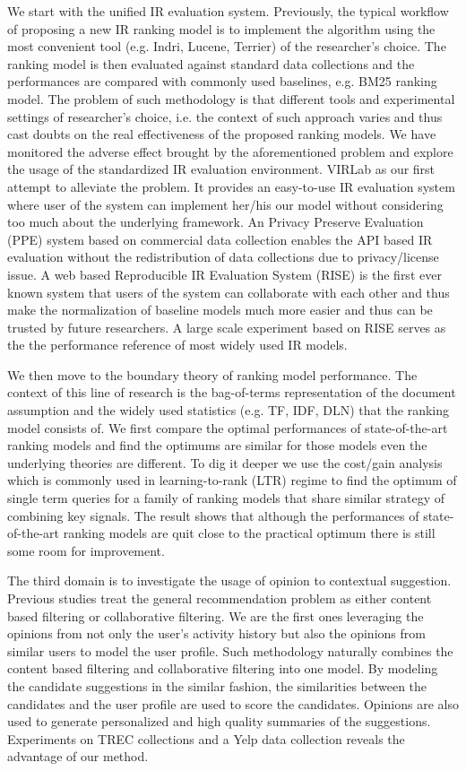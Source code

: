 We start with the unified IR evaluation system. Previously, the typical 
workflow of proposing a new IR ranking model is to implement the algorithm 
using the most convenient tool (e.g. Indri, Lucene, Terrier) of the 
researcher's choice. The ranking model is then evaluated against standard 
data collections and the performances are compared with commonly used 
baselines, e.g. BM25 ranking model. The problem of such methodology is that 
different tools and experimental settings of researcher's choice, i.e. the 
context of such approach varies and thus cast doubts on the real effectiveness 
of the proposed ranking models. 
We have monitored the adverse effect brought by the aforementioned problem and 
explore the usage of the standardized IR evaluation environment. 
VIRLab as our first attempt to alleviate the problem. It provides an 
easy-to-use IR evaluation system where user of the system can implement 
her/his our model without considering too much about the underlying framework. 
An Privacy Preserve Evaluation (PPE) system based on commercial data 
collection enables the API based IR evaluation without the redistribution 
of data collections due to privacy/license issue.
A web based Reproducible IR Evaluation System (RISE) is the first ever known 
system that users of the system can collaborate with each other and thus make 
the normalization of baseline models much more easier and thus can be trusted 
by future researchers. A large scale experiment based on RISE serves as the 
the performance reference of most widely used IR models.

We then move to the boundary theory of ranking model performance. 
The context of this line of research is the bag-of-terms representation of 
the document assumption and the widely used statistics (e.g. TF, IDF, DLN) 
that the ranking model consists of. We first compare the optimal 
performances of state-of-the-art ranking models and find the optimums 
are similar for those models even the underlying theories are different. 
To dig it deeper we use the cost/gain analysis which is commonly used in 
learning-to-rank (LTR) regime to find the optimum of single term queries for 
a family of ranking models that share similar strategy of combining key 
signals. The result shows that although the performances of state-of-the-art 
ranking models are quit close to the practical optimum there is still some 
room for improvement.

The third domain is to investigate the usage of opinion to contextual 
suggestion. Previous studies treat the general recommendation 
problem as either content based filtering or collaborative filtering. 
We are the first ones leveraging the opinions from not only the user's 
activity history but also the opinions from similar users to model the user 
profile. Such methodology naturally combines the content based filtering and 
collaborative filtering into one model. By modeling the candidate suggestions 
in the similar fashion, the similarities between the candidates and the user 
profile are used to score the candidates. Opinions are also used to generate 
personalized and high quality summaries of the suggestions. Experiments on 
TREC collections and a Yelp data collection reveals the advantage of our method.

